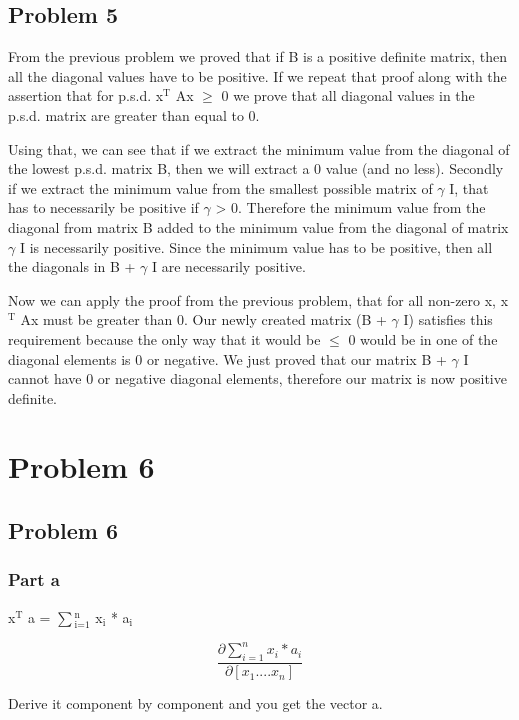 \documentclass[11pt]{article}
\begin{document}
\subsection{Problem 5}
\label{sec-5-1}

From the previous problem we proved that if B is a positive definite matrix, then all the diagonal values have to be positive. If we repeat that proof along with the assertion that for p.s.d. x$^{\text{T}}$ Ax $\ge$ 0 we prove that all diagonal values in the p.s.d. matrix are greater than equal to 0.

Using that, we can see that if we extract the minimum value from the diagonal of the lowest p.s.d. matrix B, then we will extract a 0 value (and no less). Secondly if we extract the minimum value from the smallest possible matrix of $\gamma$ I, that has to necessarily be positive if $\gamma$ > 0. Therefore the minimum value from the diagonal from matrix B added to the minimum value from the diagonal of matrix $\gamma$ I is necessarily positive. Since the minimum value has to be positive, then all the diagonals in B + $\gamma$ I are necessarily positive.

Now we can apply the proof from the previous problem, that for all non-zero x, x$^{\text{T}}$ Ax must be greater than 0. Our newly created matrix (B + $\gamma$ I) satisfies this requirement because the only way that it would be $\le$ 0 would be in one of the diagonal elements is 0 or negative. We just proved that our matrix B + $\gamma$ I cannot have 0 or negative diagonal elements, therefore our matrix is now positive definite.
\section{Problem 6}
\label{sec-6}

\subsection{Problem 6}
\label{sec-6-1}
\subsubsection{Part a}
\label{sec-6-1-1}

x$^{\text{T}}$ a = $\sum$$_{\text{i=1}}^{\text{n}}$ x$_{\text{i}}$ * a$_{\text{i}}$

$$ \dfrac{ \partial \sum_{i=1}^{n} x_i * a_i }{ \partial [x_1 .... x_n] }$$

Derive it component by component and you get the vector a.
\end{document}
